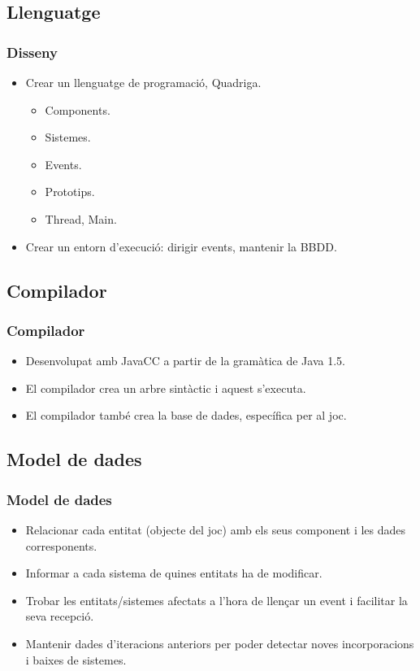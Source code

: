 \documentclass[serif,9pt]{beamer}
\begin{document}
  \subsection{Llenguatge}

    \begin{frame}\frametitle{Disseny}
      \begin{itemize}
        \item Crear un llenguatge de programació, Quadriga. 
        \begin{itemize}
          \item Components.
          \item Sistemes.
          \item Events.
          \item Prototips.
          \item Thread, Main.
        \end{itemize}
        \item Crear un entorn d'execució: dirigir events, mantenir la BBDD.
      \end{itemize}
    \end{frame}
  
  \subsection{Compilador}
  
    \begin{frame}\frametitle{Compilador}
      \begin{itemize}
        \item Desenvolupat amb JavaCC a partir de la gramàtica de Java 1.5. \bigskip
        \item El compilador crea un arbre sintàctic i aquest s'executa. \bigskip
        \item El compilador també crea la base de dades, específica per al joc.
      \end{itemize}
    \end{frame}
  
  \subsection{Model de dades}
    
    \begin{frame}\frametitle{Model de dades}
      \begin{itemize}
        \item Relacionar cada entitat (objecte del joc) amb els seus component i les dades corresponents. \bigskip
        \item Informar a cada sistema de quines entitats ha de modificar. \bigskip
        \item Trobar les entitats/sistemes afectats a l'hora de llençar un event i facilitar la seva recepció. \bigskip
        \item Mantenir dades d'iteracions anteriors per poder detectar noves incorporacions i baixes de sistemes.
      \end{itemize}
    \end{frame}
    
\end{document}
